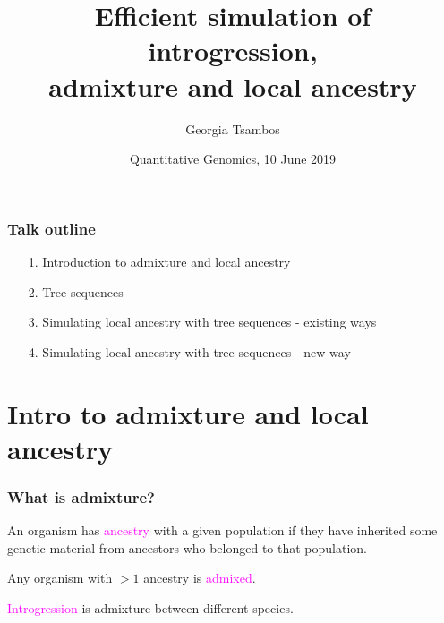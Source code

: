 \documentclass[11pt, mathserif, aspectratio=169]{beamer}
\title{Efficient simulation of introgression,\\ admixture and local ancestry}
\author{Georgia Tsambos}
\institute{{\normalsize University of Melbourne, Australia}}
\date{Quantitative Genomics, 10 June 2019}
\newcommand{\magenta}[1]{\textcolor{magenta}{#1}}
\newenvironment{wideitemize}{\itemize\addtolength{\itemsep}{10pt}}{\enditemize}
\begin{document}
\maketitle

\begin{frame}
\frametitle{Talk outline}

\begin{enumerate}
\itemsep7mm
\item[1. ] Introduction to admixture and local ancestry
\item[2. ] Tree sequences
\item[3. ] Simulating local ancestry with tree sequences - existing ways
\item[4. ] Simulating local ancestry with tree sequences - new way
\end{enumerate}
\end{frame}

\section{Intro to admixture and local ancestry}


\begin{frame}
\frametitle{What is admixture?}
%

\begin{wideitemize}
    \item An organism has \magenta{ancestry} with a given population if they have inherited some genetic material from ancestors who belonged to that population. 
    \item Any organism with $>1$ ancestry is \magenta{admixed}.
    \item \magenta{Introgression} is admixture between different species.
\end{wideitemize}

\end{frame}
\end{document}
